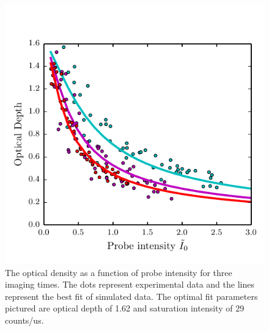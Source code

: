 \documentclass[12pt]{iopart}
\begin{document}
\begin{figure}
	\includegraphics[scale=0.57]{figure8}
\caption{The optical density as a function of probe intensity for three imaging times. The dots represent experimental data and the lines represent the best fit of simulated data. The optimal fit parameters pictured are optical depth of 1.62 and saturation intensity of 29 counts/us. }  
\label{fig:isatCalib}
\end{figure}
\end{document}
